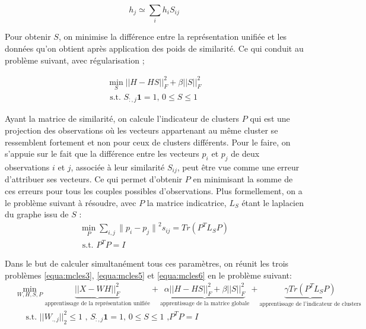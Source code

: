         \begin{equation*}
			h_j \simeq \sum_i h_iS_{ij}
  	  \end{equation*}
      
  	  Pour obtenir $S$, on minimise la différence entre la représentation unifiée et les données qu'on obtient après application des poids de similarité.
  	  Ce qui conduit au problème suivant, avec régularisation ;
 	 
  	  \begin{equation}
			\begin{aligned}
				\min_{S} {|| H - HS ||}_F^2 + \beta {|| S ||}_F^2 \\
				\text{  s.t. $S_{:,j}\textbf{1}=1$, $0\leq S \leq1$}
			\end{aligned}
			\label{equa:mcles5}
  	  \end{equation}
    
  	  Ayant la matrice de similarité, on calcule l'indicateur de clusters $P$ qui est une projection des observations où les vecteurs appartenant au même cluster se ressemblent fortement et non pour ceux de clusters différents.
   	 Pour le faire, on s'appuie sur le fait que la différence entre les vecteurs $p_i$ et $p_j$ de deux observations $i$ et $j$, associée à leur similarité $S_{ij}$, peut être vue comme une erreur d'attribuer ses vecteurs.
  	  Ce qui permet d’obtenir $P$ en minimisant la somme de ces erreurs pour tous les couples possibles d’observations.
   	 Plus formellement, on a le problème suivant à résoudre, avec
  	  $P$ la matrice indicatrice,
  	  $L_S$ étant le laplacien du graphe issu de $S$ :
  	  \begin{equation}
			\begin{aligned}
				\min_{P} \sum_{i,j} {\|p_i-p_j\|}^2s_{ij} = Tr(P^TL_SP) \\ \text{  s.t. $P^TP =I$}
			\end{aligned}
			\label{equa:mcles6}
  	  \end{equation}
    
  	  Dans le but de calculer simultanément tous ces paramètres, on réunit les trois problèmes \ref{equa:mcles3}, \ref{equa:mcles5} et \ref{equa:mcles6} en le problème suivant:
  	  \begin{equation}
			\begin{split}
				& \min_{W,H,S,P}  \underbrace{ {|| X - WH ||}_F^2 }_{\text{apprentissage de la représentation unifiée}}  + \underbrace{ \alpha{|| H - HS ||}_F^2 + \beta {|| S ||}_F^2 }_{\text{apprentissage de la matrice globale}} + \underbrace{ \gamma Tr(P^TL_SP) }_{\text{apprentissage de l'indicateur de clusters}}
     		   \\
				&\quad \text{  s.t. ${|| W_{.,j} ||}_2^2 \leq 1$ , }
				\text{$S_{:,j}\textbf{1}=1$, $0\leq S \leq1$ ,}
				\text{$P^TP =I$}
			\end{split}
			\label{equa:mcles7}
  	  \end{equation}
    
